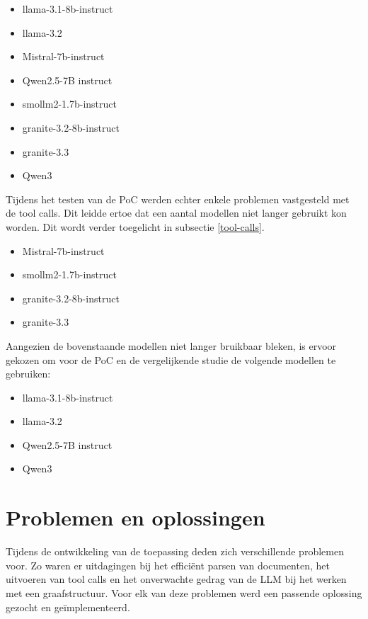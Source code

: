 \begin{itemize}
    \item llama-3.1-8b-instruct
    \item llama-3.2
    \item Mistral-7b-instruct
    \item Qwen2.5-7B instruct
    \item smollm2-1.7b-instruct
    \item granite-3.2-8b-instruct
    \item granite-3.3
    \item Qwen3
\end{itemize}

Tijdens het testen van de PoC werden echter enkele problemen vastgesteld met de tool calls. Dit leidde ertoe dat een aantal modellen niet langer gebruikt kon worden. Dit wordt verder toegelicht in subsectie \ref{tool-calls}.

\begin{itemize}
    \item Mistral-7b-instruct
    \item smollm2-1.7b-instruct
    \item granite-3.2-8b-instruct
    \item granite-3.3
\end{itemize}

Aangezien de bovenstaande modellen niet langer bruikbaar bleken, is ervoor gekozen om voor de PoC en de vergelijkende studie de volgende modellen te gebruiken:

\begin{itemize}
    \item llama-3.1-8b-instruct
    \item llama-3.2
    \item Qwen2.5-7B instruct
    \item Qwen3
\end{itemize}


\section{Problemen en oplossingen}

Tijdens de ontwikkeling van de toepassing deden zich verschillende problemen voor. Zo waren er uitdagingen bij het efficiënt parsen van documenten, het uitvoeren van tool calls en het onverwachte gedrag van de LLM bij het werken met een graafstructuur. Voor elk van deze problemen werd een passende oplossing gezocht en geïmplementeerd.

